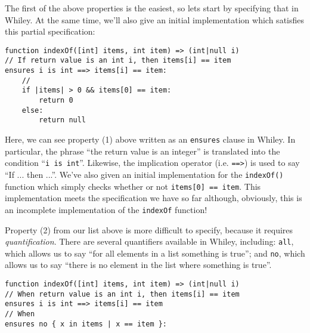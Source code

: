 The first of the above properties is the easiest, so lets start by
specifying that in Whiley.  At the same time, we'll also give an
initial implementation which satisfies this partial specification:

\begin{lstlisting}
function indexOf([int] items, int item) => (int|null i)
// If return value is an int i, then items[i] == item
ensures i is int ==> items[i] == item:
    //
    if |items| > 0 && items[0] == item:
        return 0
    else:
        return null
\end{lstlisting}

Here, we can see property (1) above written as an \lstinline{ensures}
clause in Whiley.  In particular, the phrase ``the return value is an
integer'' is translated into the condition ``\lstinline{i is int}''.
Likewise, the implication operator (i.e. \lstinline{==>}) is used to
say ``If ... then ...''.  We've also given an initial implementation
for the \lstinline{indexOf()} function which simply checks whether or
not \lstinline{items[0] == item}.  This implementation meets the
specification we have so far although, obviously, this is an
incomplete implementation of the \lstinline{indexOf} function!

Property (2) from our list above is more difficult to specify, because
it requires {\em quantification}.  There are several quantifiers
available in Whiley, including: \lstinline{all}, which allows us to
say ``for all elements in a list something is true''; and
\lstinline{no}, which allows us to say ``there is no element in the list
where something is true''.

\begin{lstlisting}
function indexOf([int] items, int item) => (int|null i)
// When return value is an int i, then items[i] == item
ensures i is int ==> items[i] == item
// When
ensures no { x in items | x == item }:
\end{lstlisting}
